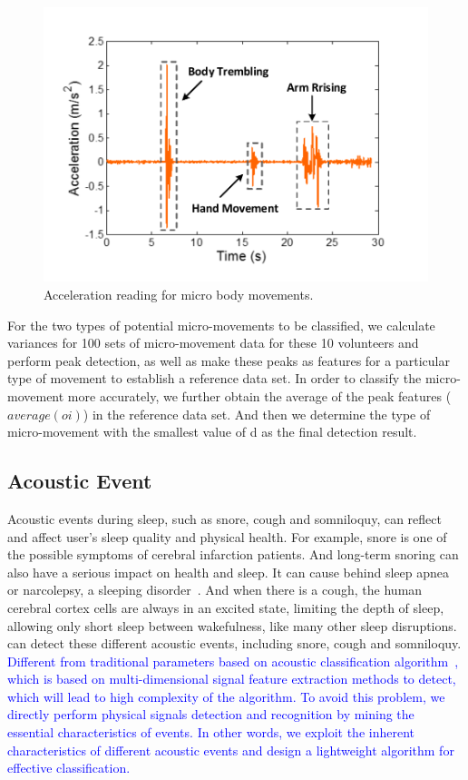 \begin{figure}[!t]
\centering
      \includegraphics[width=0.43\linewidth]{Figures/Micromovement.pdf}
  \caption{Acceleration reading for micro body movements.}\label{fig:micro-move}
\end{figure}

For the two types of potential micro-movements to be classified, we calculate variances for 100 sets of micro-movement data for these 10 volunteers and perform peak detection, as well as make these peaks as features for a particular type of movement to establish a reference data set. In order to classify the micro-movement more accurately, we further obtain the average of the peak features ($average(oi)$) in the reference data set. And then we determine the type of micro-movement with the smallest value of d as the final detection result.


\subsection{Acoustic Event \label{sec:acoustic}}
Acoustic events during sleep, such as snore, cough and somniloquy, can reflect and affect user's sleep quality and physical health. For example, snore is one of the possible symptoms of cerebral infarction patients.  And long-term snoring can also have a serious impact on health and sleep. It can cause behind sleep apnea or narcolepsy, a sleeping disorder~\cite{snoring2016,snoring2013}. And when there is a cough, the human cerebral cortex cells are always in an excited state, limiting the depth of sleep, allowing only short sleep between wakefulness, like many other sleep disruptions. {\systemname} can detect these different acoustic events, including snore, cough and somniloquy.
\textcolor{blue}{Different from traditional parameters based on acoustic classification algorithm~\cite{gu2016sleep}, which is based on multi-dimensional signal feature extraction methods to detect, which will lead to high complexity of the algorithm. To avoid this problem, we directly perform physical signals detection and recognition by mining the essential characteristics of events. In other words, we exploit the inherent characteristics of different acoustic events and design a lightweight algorithm for effective classification.}%

